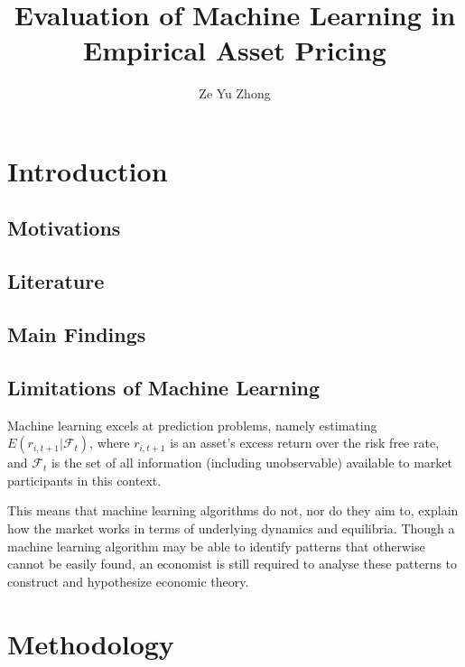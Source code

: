 \documentclass[man, a4paper, biblatex]{apa6}
\title{Evaluation of Machine Learning in Empirical Asset Pricing}
\author{Ze Yu Zhong}
\affiliation{Monash University}
\begin{document}
\maketitle

\section{Introduction}

\subsection{Motivations}


\subsection{Literature}


\subsection{Main Findings}


\subsection{Limitations of Machine Learning}

Machine learning excels at prediction problems, namely estimating $E(r_{i, t+1}|\mathcal{F}_t)$, where $r_{i, t+1}$ is an asset's excess return over the risk free rate, and $\mathcal{F}_t$ is the set of all information (including unobservable) available to market participants in this context.

This means that machine learning algorithms do not, nor do they aim to, explain how the market works in terms of underlying dynamics and equilibria. Though a machine learning algorithm may be able to identify patterns that otherwise cannot be easily found, an economist is still required to analyse these patterns to construct and hypothesize economic theory.

\section{Methodology}
\end{document}

